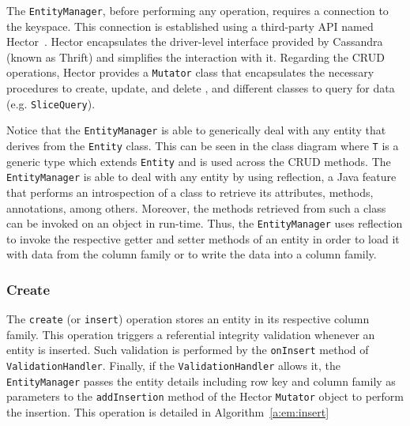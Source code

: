 	The \texttt{EntityManager},  before performing any operation,  requires a
	connection to the keyspace.  This connection is established using a third-party
	\ac{API} named Hector~\citep{hector}.  Hector  encapsulates the driver-level
	interface provided by Cassandra (known as Thrift) and simplifies the interaction
	with it.  Regarding the \ac{CRUD} operations,  Hector provides  a
	\texttt{Mutator} class that  encapsulates the necessary procedures to
	create, update, and delete , and different classes to query
	for data (e.g. \texttt{SliceQuery}).
	 
	 Notice that  the \texttt{EntityManager} is able to generically deal with any
	 entity that derives from the \texttt{Entity} class. This can be seen in the
	 class diagram where \texttt{T} is a generic type which extends \texttt{Entity} 
	 and is used across the \ac{CRUD} methods. The \texttt{EntityManager} is able
	 to deal with any entity by using reflection, a Java
	 feature that performs  an introspection of a class to retrieve its
	 attributes, methods, annotations, among others. Moreover, the
	 methods retrieved from such a class can be invoked on an object in run-time. 
	 Thus, the \texttt{EntityManager} uses reflection to invoke the respective 
	 getter and setter methods of an entity in order to load it with data
	 from the column family or to write the data into a column family.
	 
	 
	
	
	
	
	
		\subsubsection{Create}
		
		The \texttt{create} (or \texttt{insert}) operation stores an entity in its
		respective column family. This operation triggers a referential integrity
		 validation whenever an  entity is  inserted.  Such validation is performed by
		 the \texttt{onInsert} method of \texttt{ValidationHandler}.
		  Finally, if the
 		 \texttt{ValidationHandler} allows it,  the \texttt{EntityManager} passes the
		  entity details  including row key and column family as parameters to the
		 \texttt{addInsertion} method of the Hector \texttt{Mutator} object to perform
		 the insertion. This operation is detailed in Algorithm~\ref{a:em:insert}
		 
